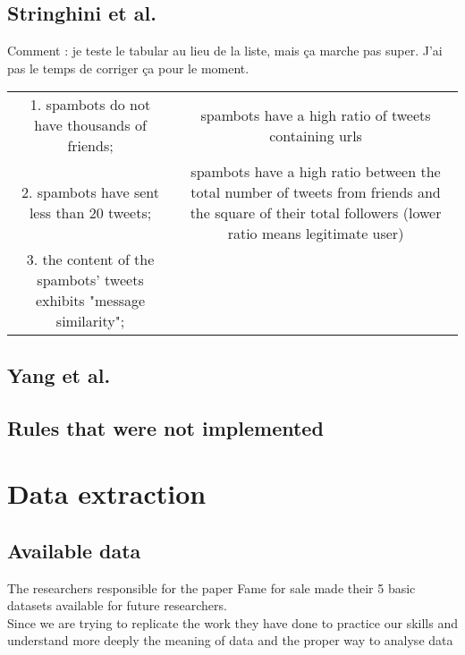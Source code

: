 \documentclass[a4paper,11pt]{article}
\begin{document}
\subsection{Stringhini et al.}

Comment : je teste le tabular au lieu de la liste, mais ça marche pas super. J'ai pas le temps de corriger ça pour le moment.\\

\begin{tabular}{cc}
\hline
1. spambots do not have thousands of friends; & spambots have a high ratio of tweets containing urls\\
2. spambots have sent less than 20 tweets; & spambots have a high ratio between the total number of tweets from friends and the square of their total followers (lower ratio means legitimate user)\\
3. the content of the spambots' tweets exhibits "message similarity"; & \\
\hline
\end{tabular}


\subsection{Yang et al.}

\subsection{Rules that were not implemented}

\section{Data extraction}

\subsection{Available data}
The researchers responsible for the paper Fame for sale made their 5 basic datasets available for future researchers.\\ 

Since we are trying to replicate the work they have done to practice our skills and understand more deeply the meaning of data and the proper way to analyse data
\end{document}
